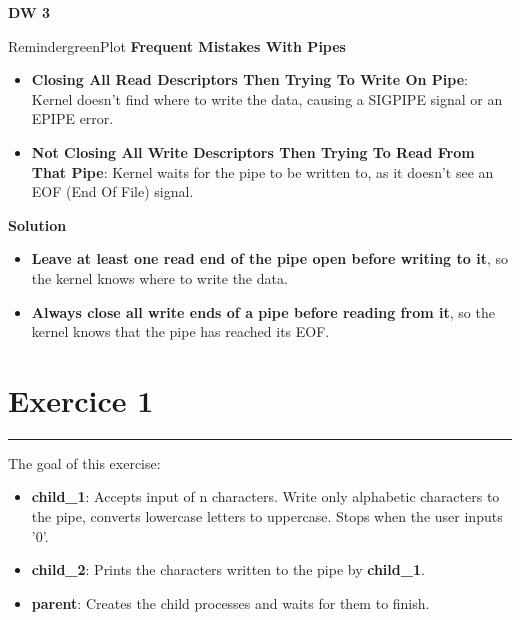 \documentclass[fleqn]{article}
\newcommand{\exer}[1]{
  \section*{Exercice #1}
  \vspace{-0.5cm}
  \noindent\rule{\textwidth}{0.5pt}%
}
\newcommand{\tit}[1]{
\begin{center}
    \Large{\textbf{{#1}}}
\end{center}
}
\begin{document}
\renewcommand{\arrayrulewidth}{0.75mm} %

\setlength{\tabcolsep}{5.5pt} %

\renewcommand{\arraystretch}{1.5} %


\tit{DW 3}



\begin{prettyBox}{Reminder}{greenPlot}
\textbf{Frequent Mistakes With Pipes}
\begin{itemize}
    \item \textbf{Closing All Read Descriptors Then Trying To Write On Pipe}: 
    Kernel doesn't find where to write the data, causing a SIGPIPE signal or an EPIPE error.
    \item \textbf{Not Closing All Write Descriptors Then Trying To Read From That Pipe}: 
    Kernel waits for the pipe to be written to, as it doesn't see an EOF (End Of File) signal.
\end{itemize}

\textbf{Solution}
\begin{itemize}
    \item \textbf{Leave at least one read end of the pipe open before writing to it}, 
    so the kernel knows where to write the data.
    \item \textbf{Always close all write ends of a pipe before reading from it}, 
    so the kernel knows that the pipe has reached its EOF.
\end{itemize}

\end{prettyBox}
\exer{1}

The goal of this exercise:

\begin{itemize}
    \item \textbf{child\_1}: Accepts input of n characters. Write only alphabetic characters to the pipe, converts lowercase letters to uppercase. Stops when the user inputs '0'.
    \item \textbf{child\_2}: Prints the characters written to the pipe by \textbf{child\_1}.
    \item \textbf{parent}: Creates the child processes and waits for them to finish.
\end{itemize}


\end{document}
